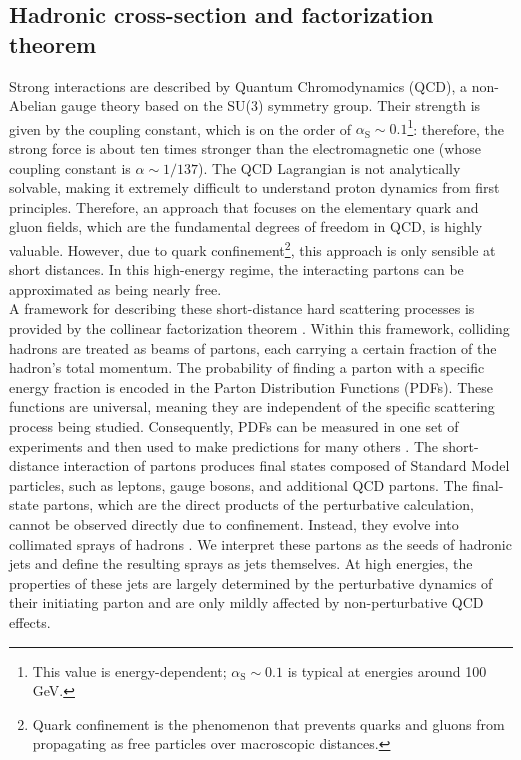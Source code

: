 \documentclass[a4paper, 12pt]{book}
\begin{document}
\subsection{Hadronic cross-section and factorization theorem}
Strong interactions are described by Quantum Chromodynamics (QCD), a non-Abelian gauge theory based on the SU(3) symmetry group. Their strength is given by the coupling constant, which is on the order of $\alpha_{\text{S}}\sim0.1$\footnote{This value is energy-dependent; $\alpha_{\text{S}}\sim0.1$ is typical at energies around 100 GeV.}: therefore, the strong force is about ten times stronger than the electromagnetic one (whose coupling constant is $\alpha\sim1/137$). The QCD Lagrangian is not analytically solvable, making it extremely difficult to understand proton dynamics from first principles. Therefore, an approach that focuses on the elementary quark and gluon fields, which are the fundamental degrees of freedom in QCD, is highly valuable. However, due to quark confinement\footnote{Quark confinement is the phenomenon that prevents quarks and gluons from propagating as free particles over macroscopic distances.}, this approach is only sensible at short distances. In this high-energy regime, the interacting partons can be approximated as being nearly free. \\
A framework for describing these short-distance hard scattering processes is provided by the collinear factorization theorem \cite{Collins:1987pm}. Within this framework, colliding hadrons are treated as beams of partons, each carrying a certain fraction of the hadron's total momentum. The probability of finding a parton with a specific energy fraction is encoded in the Parton Distribution Functions (PDFs). These functions are universal, meaning they are independent of the specific scattering process being studied. Consequently, PDFs can be measured in one set of experiments and then used to make predictions for many others \cite{Melnikov2018}. The short-distance interaction of partons produces final states composed of Standard Model particles, such as leptons, gauge bosons, and additional QCD partons. The final-state partons, which are the direct products of the perturbative calculation, cannot be observed directly due to confinement. Instead, they evolve into collimated sprays of hadrons \cite{Salam:2010nqg}. We interpret these partons as the seeds of hadronic jets and define the resulting sprays as jets themselves. At high energies, the properties of these jets are largely determined by the perturbative dynamics of their initiating parton and are only mildly affected by non-perturbative QCD effects. \\
\end{document}
